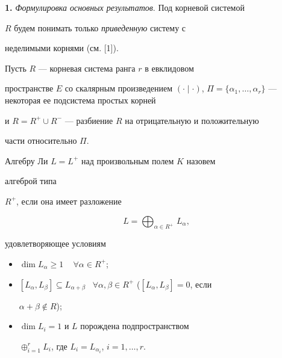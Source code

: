 \label{begin}











{\bf 1.} {\it Формулировка основных результатов}. Под корневой системой


$R$ будем понимать только {\it приведенную} систему с


неделимыми корнями (см. [1]).





Пусть $R$ --- корневая система ранга $r$ в евклидовом


пространстве $E$ со скалярным произведением $(\cdot\mid\cdot)$, $\Pi=


\{\alpha_1,\dotsc,\alpha_r\}$ --- некоторая ее подсистема простых корней


и $R=R^+\cup R^-$ --- разбиение $R$ на отрицательную и положительную


части относительно $\Pi$.





Алгебру Ли $L=L^+$ над произвольным полем $K$ назовем {\it


алгеброй типа} $R^+$, если она имеет разложение


$$


L=\bigoplus_{\alpha\in R^+}\,L_\alpha,


$$


удовлетворяющее условиям


\begin{itemize}


\item[1)] $\dim L_\alpha \ge 1$ \ \; $\forall \alpha \in R^+$;


\item[2)] $[L_\alpha,L_\beta]\subseteq L_{\alpha+\beta}$\ \; $\forall


\alpha,\beta\in R^+$ ($[L_\alpha,L_\beta]=0$, если


$\alpha+\beta\notin R$);


\item[3)] $\dim L_i=1$ и $L$ порождена подпространством


$\oplus_{i=1}^rL_i$, где $L_i=L_{\alpha_i}$, $i=1,\dotsc,r$.


\end{itemize}





